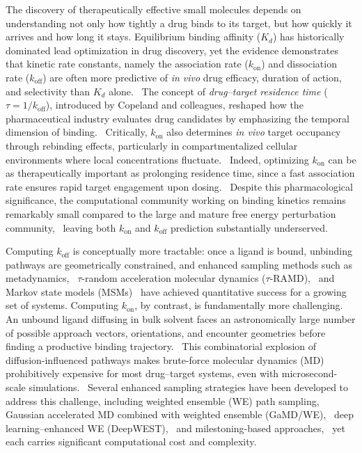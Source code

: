 \documentclass[journal=jctcce,manuscript=article,layout=twocolumn]{achemso}
\newcommand{\kon}{k_{\mathrm{on}}}
\newcommand{\koff}{k_{\mathrm{off}}}
\begin{document}
The discovery of therapeutically effective small molecules depends on understanding
not only how tightly a drug binds to its target, but how quickly it arrives and how
long it stays. Equilibrium binding affinity ($K_d$) has historically dominated lead
optimization in drug discovery, yet the evidence demonstrates that kinetic rate
constants, namely  the association rate ($\kon$) and dissociation rate
($\koff$) are often more predictive of \textit{in vivo} drug efficacy,
duration of action, and selectivity than $K_d$ alone.~\cite{Copeland2006,Copeland2016}
The concept of \textit{drug--target residence time} ($\tau = 1/\koff$),
introduced by Copeland and colleagues, reshaped how the pharmaceutical industry
evaluates drug candidates by emphasizing the temporal dimension of
binding.~\cite{Copeland2006,Schuetz2017} Critically, $\kon$ also determines
\textit{in vivo} target occupancy through rebinding effects, particularly in
compartmentalized cellular environments where local concentrations
fluctuate.~\cite{Vauquelin2016} Indeed, optimizing $\kon$ can be as
therapeutically important as prolonging residence time, since a fast association rate
ensures rapid target engagement upon dosing.~\cite{Folmer2018} Despite this
pharmacological significance, the computational community working on binding kinetics
remains remarkably small compared to the large and mature free energy perturbation
community,~\cite{Copeland2016} leaving both $\kon$ and $\koff$
prediction substantially underserved.~\cite{Wang2023bindingkinetics}

Computing $\koff$ is conceptually more tractable: once a ligand is bound,
unbinding pathways are geometrically constrained, and enhanced sampling methods such as
metadynamics,~\cite{Tiwary2013,Tiwary2015} $\tau$-random acceleration molecular
dynamics ($\tau$-RAMD),~\cite{Kokh2018} and Markov state models
(MSMs)~\cite{Plattner2015} have achieved quantitative success for a growing set of
systems. Computing $\kon$, by contrast, is fundamentally more challenging.
An unbound ligand diffusing in bulk solvent faces an astronomically large number of
possible approach vectors, orientations, and encounter geometries before finding a
productive binding trajectory.~\cite{Paul2017,Buch2011} This combinatorial explosion
of diffusion-influenced pathways makes brute-force molecular dynamics (MD) prohibitively
expensive for most drug--target systems, even with microsecond-scale
simulations.~\cite{Buch2011,Plattner2015} Several enhanced sampling strategies have
been developed to address this challenge, including weighted ensemble (WE) path
sampling,~\cite{Russo2022,Huber1996WE} Gaussian accelerated MD combined with weighted
ensemble (GaMD/WE),~\cite{Ahn2021} deep learning--enhanced WE
(DeepWEST),~\cite{Ojha2023DeepWEST} and milestoning-based
approaches,~\cite{Votapka2017SEEKR,Jagger2020MMVT} yet each carries significant
computational cost and complexity.
\end{document}
